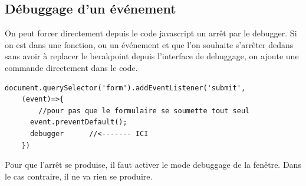 \documentclass[12pt,oneside]{scrbook}
\begin{document}
\subsection{Débuggage d'un événement}
On peut forcer directement depuis le code javascript un arrêt par le debugger. Si on est dans une fonction, ou un événement et que l'on souhaite s'arrêter dedans sans avoir à replacer le berakpoint depuis l'interface de debuggage, on ajoute une commande directement dans le code.
\begin{verbatim}
document.querySelector('form').addEventListener('submit', 
    (event)=>{
        //pour pas que le formulaire se soumette tout seul
      event.preventDefault();  
      debugger      //<------- ICI
    })
\end{verbatim}
Pour que l'arrêt se produise, il faut activer le mode debuggage de la fenêtre. Dans le cas contraire, il ne va rien se produire.
\backmatter 

\printindex 
\end{document}
